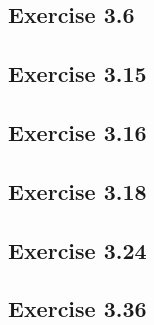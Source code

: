 \subsection{Exercise 3.6}

\subsection{Exercise 3.15}

\subsection{Exercise 3.16}

\subsection{Exercise 3.18}

\subsection{Exercise 3.24}

\subsection{Exercise 3.36}

